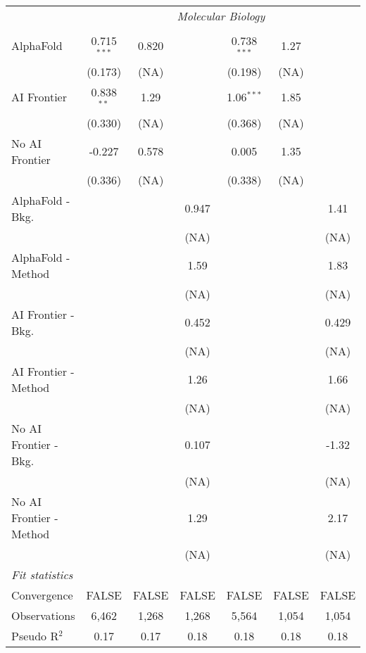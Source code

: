 \begin{tabular}{lcccccc}
 & \multicolumn{6}{c}{\textit{Molecular Biology}} \\ \\
   AlphaFold               & 0.715$^{***}$ & 0.820 &       & 0.738$^{***}$ & 1.27  &   \\   
                           & (0.173)       & (NA)  &       & (0.198)       & (NA)  &   \\   
   AI Frontier             & 0.838$^{**}$  & 1.29  &       & 1.06$^{***}$  & 1.85  &   \\   
                           & (0.330)       & (NA)  &       & (0.368)       & (NA)  &   \\   
   No AI Frontier          & -0.227        & 0.578 &       & 0.005         & 1.35  &   \\   
                           & (0.336)       & (NA)  &       & (0.338)       & (NA)  &   \\   
   AlphaFold - Bkg.        &               &       & 0.947 &               &       & 1.41\\   
                           &               &       & (NA)  &               &       & (NA)\\   
   AlphaFold - Method      &               &       & 1.59  &               &       & 1.83\\   
                           &               &       & (NA)  &               &       & (NA)\\   
   AI Frontier - Bkg.      &               &       & 0.452 &               &       & 0.429\\   
                           &               &       & (NA)  &               &       & (NA)\\   
   AI Frontier - Method    &               &       & 1.26  &               &       & 1.66\\   
                           &               &       & (NA)  &               &       & (NA)\\   
   No AI Frontier - Bkg.   &               &       & 0.107 &               &       & -1.32\\   
                           &               &       & (NA)  &               &       & (NA)\\   
   No AI Frontier - Method &               &       & 1.29  &               &       & 2.17\\   
                           &               &       & (NA)  &               &       & (NA)\\   
   \midrule
   \emph{Fit statistics}\\
   Convergence             &FALSE          & FALSE & FALSE & FALSE         & FALSE & FALSE\\  
   Observations            & 6,462         & 1,268 & 1,268 & 5,564         & 1,054 & 1,054\\  
   Pseudo R$^2$            & 0.17          & 0.17  & 0.18  & 0.18          & 0.18  & 0.18\\  
   

\end{tabular}
